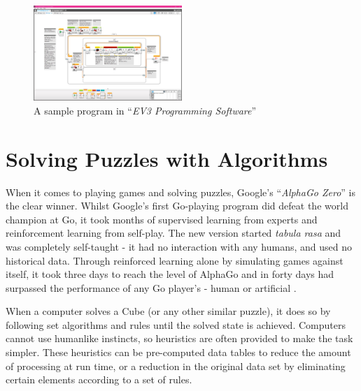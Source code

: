 \documentclass{report}
\newcommand{\tit}[1]{\textit{#1}}
\newcommand{\propernoun}[1]{\enquote{\tit{#1}}}
\begin{document}
	\begin{figure}[H]
		\centering
		\includegraphics[width=0.5\textwidth]{Resources/Images/scrEV3ProgrammingSoftware.jpg}
		\caption{A sample program in \propernoun{EV3 Programming Software}}
		\label{fig:ev3software}
	\end{figure}
    
    \section{Solving Puzzles with Algorithms}
    When it comes to playing games and solving puzzles, Google's \propernoun{AlphaGo Zero} is the clear winner. Whilst Google's first Go-playing program did defeat the world champion at Go, it took months of supervised learning from experts and reinforcement learning from self-play. The new version started \tit{tabula rasa} and was completely self-taught - it had no interaction with any humans, and used no historical data. Through reinforced learning alone by simulating games against itself, it took three days to reach the level of AlphaGo and in forty days had surpassed the performance of any Go player's - human or artificial \cite{Silver2017, Cellan-Jones2017}.
    
    When a computer solves a Cube (or any other similar puzzle), it does so by following set algorithms and rules until the solved state is achieved. Computers cannot use humanlike instincts, so heuristics are often provided to make the task simpler. These heuristics can be pre-computed data tables to reduce the amount of processing at run time, or a reduction in the original data set by eliminating certain elements according to a set of rules.
    
\end{document}
